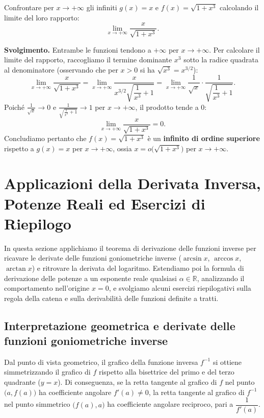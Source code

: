 \begin{esbox}
Confrontare per $x \to +\infty$ gli infiniti $g(x) = x$ e $f(x) = \sqrt{1 + x^3}$ calcolando il limite del loro rapporto:
\[
    \lim_{x \to +\infty} \frac{x}{\sqrt{1 + x^3}}.
\]

\medskip
\noindent\textbf{Svolgimento.}
Entrambe le funzioni tendono a $+\infty$ per $x \to +\infty$. Per calcolare il limite del rapporto, raccogliamo il termine dominante $x^3$ sotto la radice quadrata al denominatore (osservando che per $x > 0$ si ha $\sqrt{x^3} = x^{3/2}$):
\[
    \lim_{x \to +\infty} \frac{x}{\sqrt{1 + x^3}} = \lim_{x \to +\infty} \frac{x}{x^{3/2}\sqrt{\dfrac{1}{x^3} + 1}} = \lim_{x \to +\infty} \frac{1}{\sqrt{x}} \cdot \frac{1}{\sqrt{\dfrac{1}{x^3} + 1}}.
\]
Poiché $\frac{1}{\sqrt{x}} \to 0$ e $\frac{1}{\sqrt{\frac{1}{x^3} + 1}} \to 1$ per $x \to +\infty$, il prodotto tende a $0$:
\[
    \lim_{x \to +\infty} \frac{x}{\sqrt{1 + x^3}} = 0.
\]
Concludiamo pertanto che $f(x) = \sqrt{1 + x^3}$ è un \textbf{infinito di ordine superiore} rispetto a $g(x) = x$ per $x \to +\infty$, ossia $x = o\bigl(\sqrt{1 + x^3}\bigr)$ per $x \to +\infty$.
\end{esbox}

\section{Applicazioni della Derivata Inversa, Potenze Reali ed Esercizi di Riepilogo}

In questa sezione applichiamo il teorema di derivazione delle funzioni inverse per ricavare le derivate delle funzioni goniometriche inverse ($\arcsin x$, $\arccos x$, $\arctan x$) e ritrovare la derivata del logaritmo. Estendiamo poi la formula di derivazione delle potenze a un esponente reale qualsiasi $\alpha \in \mathbb{R}$, analizzando il comportamento nell'origine $x = 0$, e svolgiamo alcuni esercizi riepilogativi sulla regola della catena e sulla derivabilità delle funzioni definite a tratti.

\subsection{Interpretazione geometrica e derivate delle funzioni goniometriche inverse}

Dal punto di vista geometrico, il grafico della funzione inversa $f^{-1}$ si ottiene simmetrizzando il grafico di $f$ rispetto alla bisettrice del primo e del terzo quadrante ($y = x$). Di conseguenza, se la retta tangente al grafico di $f$ nel punto $\bigl(a, f(a)\bigr)$ ha coefficiente angolare $f'(a) \neq 0$, la retta tangente al grafico di $f^{-1}$ nel punto simmetrico $\bigl(f(a), a\bigr)$ ha coefficiente angolare reciproco, pari a $\dfrac{1}{f'(a)}$.

